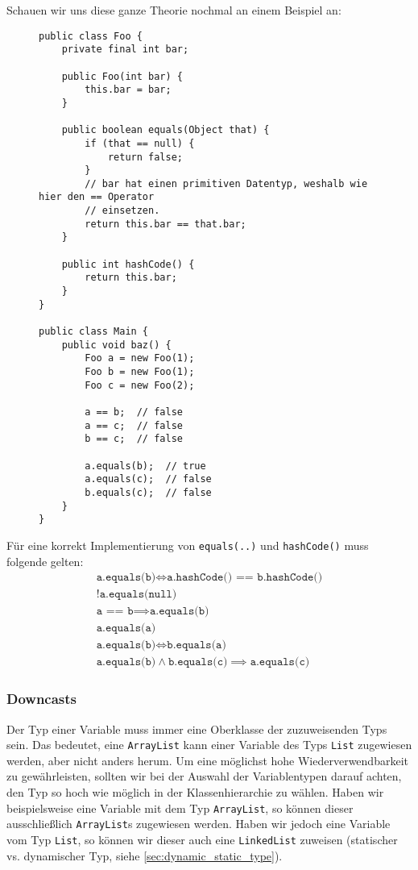 		Schauen wir uns diese ganze Theorie nochmal an einem Beispiel an:
		\begin{figure}[H]
			\centering
			\begin{lstlisting}
public class Foo {
	private final int bar;

	public Foo(int bar) {
		this.bar = bar;
	}

	public boolean equals(Object that) {
		if (that == null) {
			return false;
		}
		// bar hat einen primitiven Datentyp, weshalb wie hier den == Operator
		// einsetzen.
		return this.bar == that.bar;
	}

	public int hashCode() {
		return this.bar;
	}
}

public class Main {
	public void baz() {
		Foo a = new Foo(1);
		Foo b = new Foo(1);
		Foo c = new Foo(2);

		a == b;  // false
		a == c;  // false
		b == c;  // false

		a.equals(b);  // true
		a.equals(c);  // false
		b.equals(c);  // false
	}
}
\end{lstlisting}
		\end{figure}
		Für eine korrekt Implementierung von \lstinline|equals(..)| und \lstinline|hashCode()| muss folgende gelten:
		\begin{align*}
			\texttt{a.equals(b)} \iff \texttt{a.hashCode() == b.hashCode()} \\
			!\texttt{a.equals(null)} \\
			\texttt{a == b} \implies \texttt{a.equals(b)} \tag{Konsistenz} \\
			\texttt{a.equals(a)} \tag{Reflexivität} \\
			\texttt{a.equals(b)} \iff \texttt{b.equals(a)} \tag{Symmetrie} \\
			\texttt{a.equals(b)} \land \texttt{b.equals(c)} \implies \texttt{a.equals(c)} \tag{Transitivität}
		\end{align*}
	
	\subsubsection{Downcasts}
		Der Typ einer Variable muss immer eine Oberklasse der zuzuweisenden Typs sein. Das bedeutet, eine \lstinline|ArrayList| kann einer Variable des Typs \lstinline|List| zugewiesen werden, aber nicht anders herum. Um eine möglichst hohe Wiederverwendbarkeit zu gewährleisten, sollten wir bei der Auswahl der Variablentypen darauf achten, den Typ so hoch wie möglich in der Klassenhierarchie zu wählen. Haben wir beispielsweise eine Variable mit dem Typ \lstinline|ArrayList|, so können dieser ausschließlich \lstinline|ArrayList|s zugewiesen werden. Haben wir jedoch eine Variable vom Typ \lstinline|List|, so können wir dieser auch eine \lstinline|LinkedList| zuweisen (statischer vs. dynamischer Typ, siehe \ref{sec:dynamic_static_type}).
	
